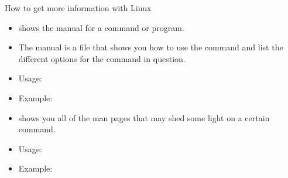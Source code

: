 \documentclass[10pt,t]{beamer}
\begin{document}
\begin{frame}[fragile]{How to get more information with Linux}
  \begin{itemize}
    \item {} shows the manual for a command or program.
    \item The manual is a file that shows you how to use the command and list the different options for the command in question.
    \item Usage: 
    \item Example: 
    \item {} shows you all of the man pages that may shed some light on a certain command.
    \item Usage: 
    \item Example: 
  \end{itemize}
\end{frame}
\end{document}
